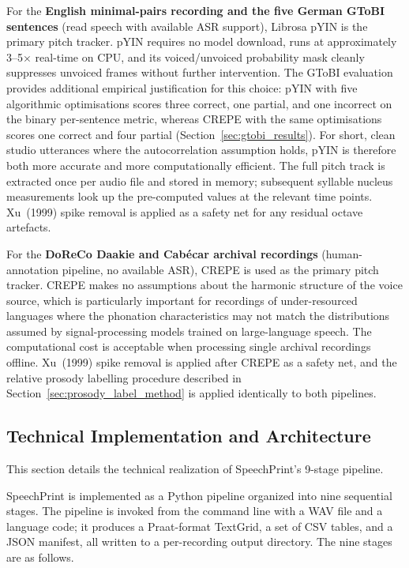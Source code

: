 For the \textbf{English minimal-pairs recording and the five German GToBI
sentences} (read speech with available ASR support), Librosa pYIN is the primary
pitch tracker. pYIN requires no model download, runs at approximately
3--5$\times$ real-time on CPU, and its voiced/unvoiced probability mask cleanly
suppresses unvoiced frames without further intervention. The GToBI evaluation
provides additional empirical justification for this choice: pYIN with five
algorithmic optimisations scores three correct, one partial, and one incorrect
on the binary per-sentence metric, whereas CREPE with the same optimisations
scores one correct and four partial (Section~\ref{sec:gtobi_results}). For
short, clean studio utterances where the autocorrelation assumption holds,
pYIN is therefore both more accurate and more computationally efficient.
The full pitch track is extracted once per audio file and stored in memory;
subsequent syllable nucleus measurements look up the pre-computed values at
the relevant time points. Xu~(1999) spike removal is applied as a safety net
for any residual octave artefacts.

For the \textbf{DoReCo Daakie and Cabécar archival recordings}
(human-annotation pipeline, no available ASR), CREPE is used as the primary
pitch tracker. CREPE makes no assumptions about the harmonic structure of the
voice source, which is particularly important for recordings of
under-resourced languages where the phonation characteristics may not match
the distributions assumed by signal-processing models trained on large-language
speech. The computational cost is acceptable when processing single archival
recordings offline. Xu~(1999) spike removal is applied after CREPE as a safety
net, and the relative prosody labelling procedure described in
Section~\ref{sec:prosody_label_method} is applied identically to both
pipelines.

\subsection{Technical Implementation and Architecture}
\label{sec:implementation}

This section details the technical realization of SpeechPrint's 9-stage pipeline.

SpeechPrint is implemented as a Python pipeline organized into nine sequential
stages. The pipeline is invoked from the command line with a WAV file and a
language code; it produces a Praat-format TextGrid, a set of CSV tables, and a
JSON manifest, all written to a per-recording output directory. The nine stages
are as follows.

